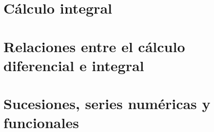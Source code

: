 
\chapter{Cálculo integral}

\chapter{Relaciones entre el cálculo diferencial e integral}

\chapter{Sucesiones, series numéricas y funcionales}




